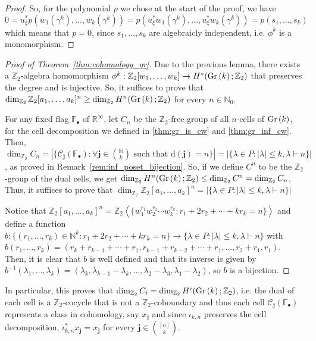 \begin{proof}
So, for the polynomial $p$ we chose at the start of the proof, we have $0=u_{\xi}^*p(w_1(\gamma^k),\ldots,w_k(\gamma^k))=p(u^*_{\xi}w_1(\gamma^k),\ldots,u^*_{\xi}w_k(\gamma^k))=p(s_1,\ldots,s_k)$ which means that $p=0$, since $s_1,\ldots,s_k$ are algebraicly independent, i.e. $\phi^k$ is a monomorphism.
\end{proof}
\begin{proof}[Proof of Theorem~\ref{thm:cohomology_gr}] Due to the previous lemma, there exists a $\mathbb{Z}_2$-algebra homomorphism $\phi^k:\mathbb{Z}_2[w_1,\ldots,w_k]\to H^*(\Gr{k};\mathbb{Z}_2)$ that preserves the degree and is injective. So, it suffices to prove that $\dim_{\mathbb{Z}_2}\mathbb{Z}_2[a_1,\ldots,a_k]^n\geq\dim_{\mathbb{Z}_2}H^n(\Gr{k};\mathbb{Z}_2)$ for every $n\in\mathbb{N}_0$.

For any fixed flag $\mathbb{F}_{\bullet}$ of $\mathbb{R}^{\infty}$, let $C_n$ be the $\mathbb{Z}_2$-free group of all $n$-cells of $\Gr{k}$, for the cell decomposition we defined in \ref{thm:gr_is_cw} and \ref{thm:gr_inf_cw}. Then, $\dim_{\mathbb{Z}_2}C_n=|\{\mathcal{C}_{\mathbf{j}}(\mathbb{F}_{\bullet}):\forall\mathbf{j}\in\binom{\mathbb{N}}{k}\text{ such that }\mathrm{d}(\mathbf{j})=n\}|=|\{\lambda\in P:|\lambda|\leq k,\lambda\vdash n\}|$, as proved in Remark~\ref{rem:inf_poset_bijection}. So, if we define $C^n$ to be the $\mathbb{Z}_2$-group of the dual cells, we get $\dim_{\mathbb{Z}_2}H^n(\Gr{k};\mathbb{Z}_2)\leq\dim_{\mathbb{Z}_2}C^n=\dim_{\mathbb{Z}_2}C_n$. Thus, it suffices to prove that $\dim_{\mathbb{Z}_2}\mathbb{Z}_2[a_1,\ldots,a_k]^n=|\{\lambda\in P:|\lambda|\leq k,\lambda\vdash n\}|$

Notice that $\mathbb{Z}_2[a_1,\ldots,a_k]^n=\mathbb{Z}_2\left<\{w_1^{r_1}w_2^{r_2}\cdots w_k^{r_k}:r_1+2r_2+\cdots+kr_k=n\}\right>$ and define a function $b:\{(r_1,\ldots,r_k)\in\mathbb{N}^k:r_1+2r_2+\cdots+kr_k=n\}\to\{\lambda\in P:|\lambda|\leq k,\lambda\vdash n\}$ with $b(r_1,\ldots,r_k)=(r_k+r_{k-1}+\cdots+r_1,r_{k-1}+r_{k-2}+\cdots+r_1,\ldots,r_2+r_1,r_1)$. Then, it is clear that $b$ is well defined and that its inverse is given by $b^{-1}(\lambda_1,\ldots,\lambda_k)=(\lambda_k,\lambda_{k-1}-\lambda_k,\ldots,\lambda_2-\lambda_3,\lambda_1-\lambda_2)$, so $b$ is a bijection.
\end{proof}
\begin{remark}\label{rem:epimorphism} In particular, this proves that $\dim_{\mathbb{Z}_2}C_i=\dim_{\mathbb{Z}_2}H^i(\Gr{k};\mathbb{Z}_2)$, i.e. the dual of each cell is a $\mathbb{Z}_2$-cocycle that is not a $\mathbb{Z}_2$-coboundary and thus each cell $\mathcal{C}_{\mathbf{j}}(\mathbb{F}_{\bullet})$ represents a class in cohomology, say $x_{\mathbb{j}}$ and since $\iota_{k,n}$ preserves the cell decomposition, $\iota_{k,n}^*x_{\mathbf{j}}=x_{\mathbf{j}}$ for every $\mathbf{j}\in\binom{[n]}{k}$.
\end{remark}
